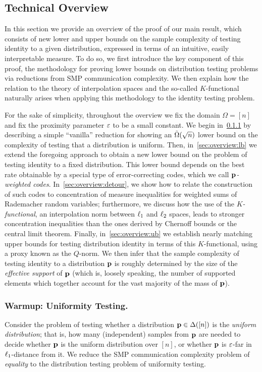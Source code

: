 \subsection{Technical Overview}
\label{sec:technical_overview}
In this section we provide an overview of the proof of our main result, which consists of new lower and upper bounds on the sample complexity of testing identity to a given distribution, expressed in terms of an intuitive, easily interpretable measure. To do so, we first introduce the key component of this proof, the methodology for proving lower bounds on distribution testing problems via reductions from SMP communication complexity. We then explain how the relation to the theory of interpolation spaces and the so-called $K$-functional naturally arises when applying this methodology to the identity testing problem.

 For the sake of simplicity, throughout the overview we fix the domain $\Omega = [n]$ and fix the proximity parameter $\eps$ to be a small constant. We begin in~\cref{sec:uniformity_overview} by describing a simple ``vanilla'' reduction for showing an $\tildeOmega{\sqrt{n}}$ lower bound on the complexity of testing that a distribution is uniform. Then, in~\cref{sec:overview:lb} we extend the foregoing approach to obtain a new lower bound on the problem of testing identity to a fixed distribution. This lower bound depends on the best rate obtainable by a special type of error-correcting codes, which we call \emph{$\p$-weighted codes}. In~\cref{sec:overview:detour}, we show how to relate the construction of such codes to concentration of measure inequalities for weighted sums of Rademacher random variables; furthermore, we discuss how the use of the \emph{$K$-functional}, an interpolation norm between $\lp[1]$ and $\lp[2]$ spaces, leads to stronger concentration inequalities than the ones derived by Chernoff bounds or the central limit theorem. Finally, in~\cref{sec:overview:ub} we establish nearly matching upper bounds for testing distribution identity in terms of this $K$-functional, using a proxy known as the $Q$-norm. We then infer that the sample complexity of testing identity to a distribution $\p$ is roughly determined by the size of the \emph{effective support} of $\p$ (which is, loosely speaking, the number of supported elements which together account for the vast majority of the mass of $\p$).

\subsubsection{Warmup: Uniformity Testing.} 
\label{sec:uniformity_overview}
Consider the problem of testing whether a distribution $\q\in\distribs{[n]}$ is the \emph{uniform distribution}; that is, how many (independent) samples from $\q$ are needed to decide whether $\q$ is the uniform distribution over $[n]$, or whether $\q$ is $\eps$-far in $\lp[1]$-distance from it. We reduce the SMP communication complexity problem of \emph{equality} to the distribution testing problem of uniformity testing.


